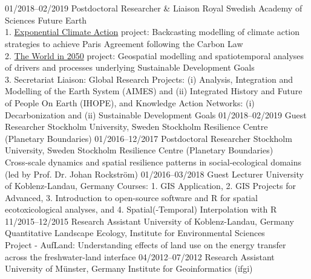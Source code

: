 \documentclass[]{friggeri-cv} %
\begin{document}
\section{}
\begin{entrylist}
\entry
{\small{01/2018--02/2019}}
{Postdoctoral Researcher \& Liaison}
{Royal Swedish Academy of Sciences}
{Future Earth \\
1. \href{https://x-cac.futureearth.org/} {Exponential Climate Action} project: Backcasting modelling of climate action strategies to achieve Paris Agreement following the Carbon Law\\
2. \href{http://www.iiasa.ac.at/web/home/research/twi/TWI2050.html} {The World in 2050} project: Geospatial modelling and spatiotemporal analyses of drivers and processes underlying Sustainable Development Goals\\
3. Secretariat Liaison: Global Research Projects: (i) Analysis, Integration and Modelling of the Earth System (AIMES) and (ii) Integrated History and Future of People On Earth (IHOPE), and Knowledge Action Networks: (i) Decarbonization and (ii) Sustainable Development Goals}
\entry
{\small{01/2018--02/2019}}
{Guest Researcher}
{Stockholm University, Sweden}
{Stockholm Resilience Centre (Planetary Boundaries)}
\entry
{\small{01/2016--12/2017}}
{Postdoctoral Researcher}
{Stockholm University, Sweden}
{Stockholm Resilience Centre (Planetary Boundaries) \\
Cross-scale dynamics and spatial resilience patterns in social-ecological domains (led by Prof. Dr. Johan Rockstr\"om)}
\entry
{\small{01/2016--03/2018}}
{Guest Lecturer}
{University of Koblenz-Landau, Germany}
{Courses: 1. GIS Application, 2. GIS Projects for Advanced, 3. Introduction to open-source software and R for spatial ecotoxicological analyses, and 4. Spatial(-Temporal) Interpolation with R}
\entry
{\small{11/2015--12/2015}}
{Research Assistant}
{University of Koblenz-Landau, Germany}
{Quantitative Landscape Ecology, Institute for Environmental Sciences\\
Project - AufLand: Understanding effects of land use on the energy transfer across the freshwater-land interface}
\entry
{\small{04/2012--07/2012}}
{Research Assistant}
{University of M\"unster, Germany}
{Institute for Geoinformatics (ifgi)\\
}
\end{entrylist}
\end{document}
